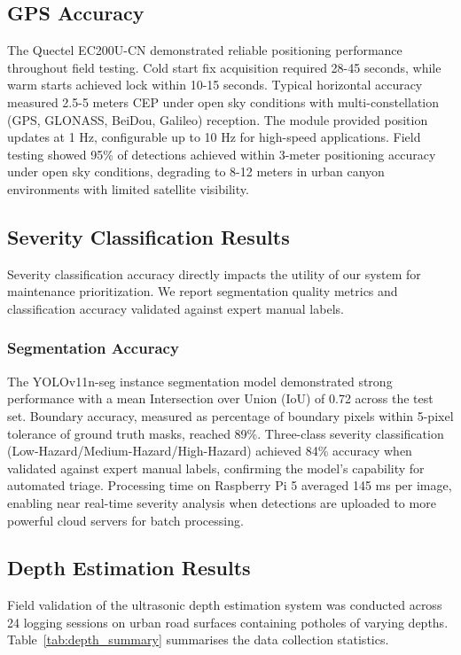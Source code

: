 \documentclass{ieeeaccess}
\begin{document}
\subsection{GPS Accuracy}
The Quectel EC200U-CN demonstrated reliable positioning performance throughout field testing. Cold start fix acquisition required 28-45 seconds, while warm starts achieved lock within 10-15 seconds. Typical horizontal accuracy measured 2.5-5 meters CEP under open sky conditions with multi-constellation (GPS, GLONASS, BeiDou, Galileo) reception. The module provided position updates at 1 Hz, configurable up to 10 Hz for high-speed applications. Field testing showed 95\% of detections achieved within 3-meter positioning accuracy under open sky conditions, degrading to 8-12 meters in urban canyon environments with limited satellite visibility.

\subsection{Severity Classification Results}

Severity classification accuracy directly impacts the utility of our system for maintenance prioritization. We report segmentation quality metrics and classification accuracy validated against expert manual labels.

\subsubsection{Segmentation Accuracy}
The YOLOv11n-seg instance segmentation model demonstrated strong performance with a mean Intersection over Union (IoU) of 0.72 across the test set. Boundary accuracy, measured as percentage of boundary pixels within 5-pixel tolerance of ground truth masks, reached 89\%. Three-class severity classification (Low-Hazard/Medium-Hazard/High-Hazard) achieved 84\% accuracy when validated against expert manual labels, confirming the model's capability for automated triage. Processing time on Raspberry Pi 5 averaged 145 ms per image, enabling near real-time severity analysis when detections are uploaded to more powerful cloud servers for batch processing.

\subsection{Depth Estimation Results}

Field validation of the ultrasonic depth estimation system was conducted across 24 logging sessions on urban road surfaces containing potholes of varying depths. Table~\ref{tab:depth_summary} summarises the data collection statistics.
\end{document}
